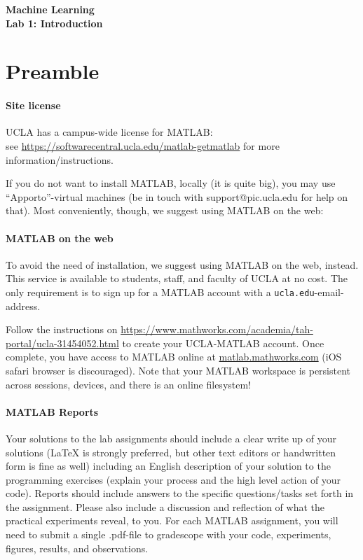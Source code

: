 \documentclass[11pt,noanswers,addpoints]{exam}
\begin{document}
{\Large{\textbf{Machine Learning}}} \\[2mm]
\textbf{\Huge{Lab 1: Introduction}}\\[2mm]

\section{Preamble}

\paragraph{Site license}
UCLA has a campus-wide license for MATLAB:\\
 see  \url{https://softwarecentral.ucla.edu/matlab-getmatlab} for more information/instructions.

If you do not want to install MATLAB, locally (it is quite big), you may use ``Apporto''-virtual machines (be in touch with support@pic.ucla.edu for help on that). Most conveniently, though, we suggest using MATLAB on the web: 

\paragraph{MATLAB on the web}
To avoid the need of installation, we suggest using MATLAB on the web, instead. This service is available to students, staff, and faculty of UCLA at no cost. The only requirement is to sign up for a MATLAB account with a \texttt{ucla.edu}-email-address.

Follow the instructions on \url{https://www.mathworks.com/academia/tah-portal/ucla-31454052.html} to create your UCLA-MATLAB account. Once complete, you have access to MATLAB online at \url{matlab.mathworks.com} (iOS safari browser is discouraged).
Note that your MATLAB workspace is persistent across sessions, devices, and there is an online filesystem!

\paragraph{MATLAB Reports}
Your solutions to the lab assignments should include a clear write up of your solutions (LaTeX is strongly
preferred, but other text editors or handwritten form is fine as well) including an English description of your solution to the programming exercises (explain your process
and the high level action of your code). Reports should include answers to the specific questions/tasks set forth in the assignment. Please also include a discussion and reflection of what the practical experiments reveal, to you. For each MATLAB assignment, you will need to submit a single .pdf-file to gradescope with your code, experiments, figures, results, and observations.
\end{document}
